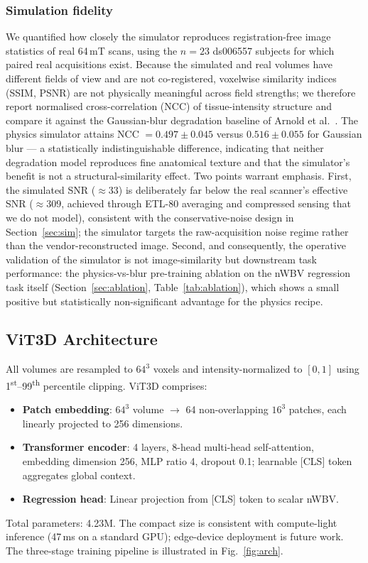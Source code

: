 \documentclass[12pt,a4paper]{article}
\begin{document}
\subsubsection*{Simulation fidelity}
We quantified how closely the simulator reproduces registration-free
image statistics of real 64\,mT scans, using the $n = 23$ ds006557
subjects for which paired real acquisitions exist. Because the
simulated and real volumes have different fields of view and are not
co-registered, voxelwise similarity indices (SSIM, PSNR) are not
physically meaningful across field strengths; we therefore report
normalised cross-correlation (NCC) of tissue-intensity structure and
compare it against the Gaussian-blur degradation baseline of Arnold et
al.~\cite{arnold2022simulated}. The physics simulator attains
NCC $= 0.497 \pm 0.045$ versus $0.516 \pm 0.055$ for Gaussian blur ---
a statistically indistinguishable difference, indicating that neither
degradation model reproduces fine anatomical texture and that the
simulator's benefit is not a structural-similarity effect. Two points
warrant emphasis. First, the simulated SNR ($\approx 33$) is
deliberately far below the real scanner's effective SNR ($\approx 309$,
achieved through ETL-80 averaging and compressed sensing that we do not
model), consistent with the conservative-noise design in
Section~\ref{sec:sim}; the simulator targets the raw-acquisition noise
regime rather than the vendor-reconstructed image. Second, and
consequently, the operative validation of the simulator is not
image-similarity but downstream task performance: the physics-vs-blur
pre-training ablation on the nWBV regression task itself
(Section~\ref{sec:ablation}, Table~\ref{tab:ablation}), which shows a
small positive but statistically non-significant advantage for the
physics recipe.

\subsection{ViT3D Architecture}
\label{sec:arch}

All volumes are resampled to $64^3$ voxels and intensity-normalized to
$[0, 1]$ using 1\textsuperscript{st}--99\textsuperscript{th} percentile
clipping. ViT3D comprises:
\begin{itemize}
  \item \textbf{Patch embedding}: $64^3$ volume $\to$ 64 non-overlapping
        $16^3$ patches, each linearly projected to 256 dimensions.
  \item \textbf{Transformer encoder}: 4 layers, 8-head multi-head
        self-attention, embedding dimension 256, MLP ratio 4, dropout 0.1;
        learnable [CLS] token aggregates global context.
  \item \textbf{Regression head}: Linear projection from [CLS] token to
        scalar nWBV.
\end{itemize}
Total parameters: 4.23M. The compact size is consistent with
compute-light inference (47\,ms on a standard GPU); edge-device
deployment is future work. The three-stage training pipeline is illustrated in
Fig.~\ref{fig:arch}.
\end{document}
